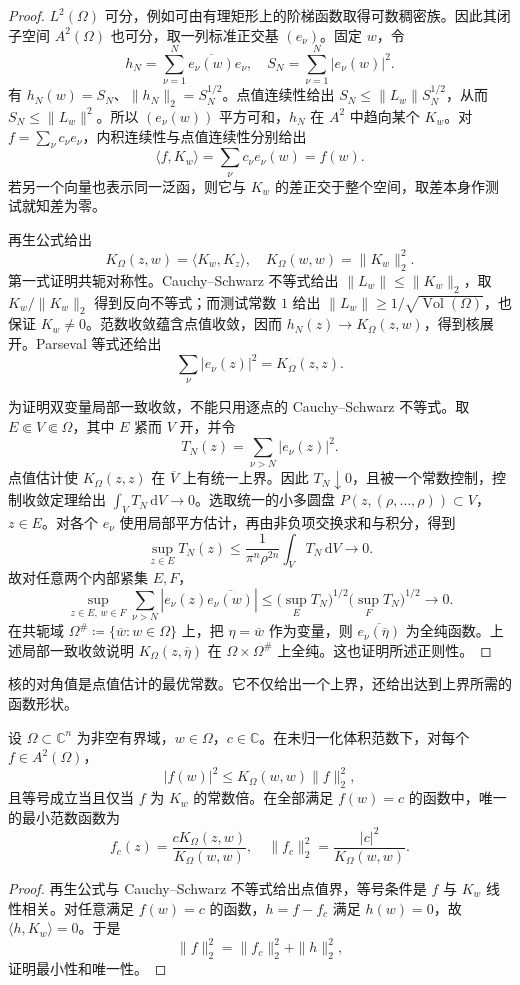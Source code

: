 \begin{proof}
\(L^2(\Omega)\) 可分，例如可由有理矩形上的阶梯函数取得可数稠密族。因此其闭子空间 \(A^2(\Omega)\) 也可分，取一列标准正交基 \((e_\nu)\)。固定 \(w\)，令
\[
 h_N=\sum_{\nu=1}^N\overline{e_\nu(w)}e_\nu,
 \quad S_N=\sum_{\nu=1}^N|e_\nu(w)|^2.
\]
有 \(h_N(w)=S_N\)、\(\|h_N\|_2=S_N^{1/2}\)。点值连续性给出 \(S_N\le\|L_w\|S_N^{1/2}\)，从而 \(S_N\le\|L_w\|^2\)。所以 \((e_\nu(w))\) 平方可和，\(h_N\) 在 \(A^2\) 中趋向某个 \(K_w\)。对 \(f=\sum_\nu c_\nu e_\nu\)，内积连续性与点值连续性分别给出
\[
 \langle f,K_w\rangle=\sum_\nu c_\nu e_\nu(w)=f(w).
\]
若另一个向量也表示同一泛函，则它与 \(K_w\) 的差正交于整个空间，取差本身作测试就知差为零。

再生公式给出
\[
 K_\Omega(z,w)=\langle K_w,K_z\rangle,
 \quad K_\Omega(w,w)=\|K_w\|_2^2.
\]
第一式证明共轭对称性。Cauchy--Schwarz 不等式给出 \(\|L_w\|\le\|K_w\|_2\)，取 \(K_w/\|K_w\|_2\) 得到反向不等式；而测试常数 \(1\) 给出 \(\|L_w\|\ge1/\sqrt{\operatorname{Vol}(\Omega)}\)，也保证 \(K_w\ne0\)。范数收敛蕴含点值收敛，因而 \(h_N(z)\to K_\Omega(z,w)\)，得到核展开。Parseval 等式还给出
\[
 \sum_\nu|e_\nu(z)|^2=K_\Omega(z,z).
\]

为证明双变量局部一致收敛，不能只用逐点的 Cauchy--Schwarz 不等式。取 \(E\Subset V\Subset\Omega\)，其中 \(E\) 紧而 \(V\) 开，并令
\[
 T_N(z)=\sum_{\nu>N}|e_\nu(z)|^2.
\]
点值估计使 \(K_\Omega(z,z)\) 在 \(\overline V\) 上有统一上界。因此 \(T_N\downarrow0\)，且被一个常数控制，控制收敛定理给出 \(\int_VT_N\,\mathrm{d}V\to0\)。选取统一的小多圆盘 \(P(z,(\rho,\ldots,\rho))\subset V\)，\(z\in E\)。对各个 \(e_\nu\) 使用局部平方估计，再由非负项交换求和与积分，得到
\[
 \sup_{z\in E}T_N(z)
 \le\frac1{\pi^n\rho^{2n}}\int_VT_N\,\mathrm{d}V\longrightarrow0.
\]
故对任意两个内部紧集 \(E,F\)，
\[
 \sup_{z\in E,\,w\in F}\sum_{\nu>N}
 |e_\nu(z)\overline{e_\nu(w)}|
 \le\bigl(\sup_E T_N\bigr)^{1/2}
      \bigl(\sup_F T_N\bigr)^{1/2}\longrightarrow0.
\]
在共轭域 \(\Omega^\#\coloneqq\{\overline w:w\in\Omega\}\) 上，把 \(\eta=\overline w\) 作为变量，则 \(\overline{e_\nu(\overline\eta)}\) 为全纯函数。上述局部一致收敛说明 \(K_\Omega(z,\overline\eta)\) 在 \(\Omega\times\Omega^\#\) 上全纯。这也证明所述正则性。
\end{proof}

核的对角值是点值估计的最优常数。它不仅给出一个上界，还给出达到上界所需的函数形状。

\begin{corollary}[点值约束下的最小范数]\label{b3:cor:29-bergman-extremal}
设 \(\Omega\subset\mathbb C^n\) 为非空有界域，\(w\in\Omega\)，\(c\in\mathbb C\)。在未归一化体积范数下，对每个 \(f\in A^2(\Omega)\)，
\[
 |f(w)|^2\le K_\Omega(w,w)\|f\|_2^2,
\]
且等号成立当且仅当 \(f\) 为 \(K_w\) 的常数倍。在全部满足 \(f(w)=c\) 的函数中，唯一的最小范数函数为
\[
 f_c(z)=\frac{cK_\Omega(z,w)}{K_\Omega(w,w)},
 \quad
 \|f_c\|_2^2=\frac{|c|^2}{K_\Omega(w,w)}.
\]
\end{corollary}
\begin{proof}
再生公式与 Cauchy--Schwarz 不等式给出点值界，等号条件是 \(f\) 与 \(K_w\) 线性相关。对任意满足 \(f(w)=c\) 的函数，\(h=f-f_c\) 满足 \(h(w)=0\)，故 \(\langle h,K_w\rangle=0\)。于是
\[
 \|f\|_2^2=\|f_c\|_2^2+\|h\|_2^2,
\]
证明最小性和唯一性。
\end{proof}

